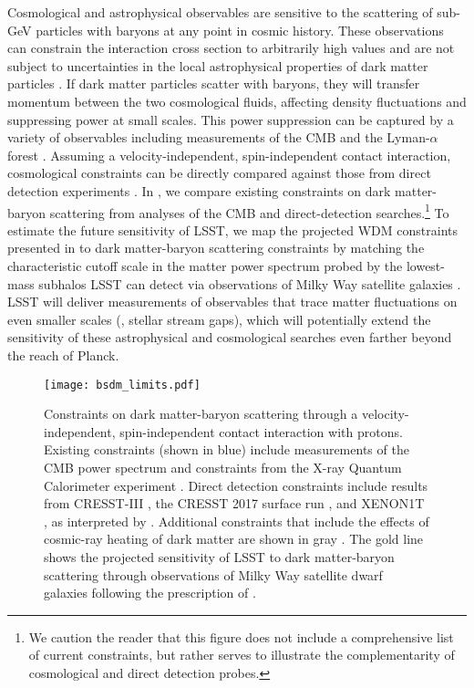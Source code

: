 Cosmological and astrophysical observables are sensitive to the scattering of sub-GeV particles with baryons at any point in cosmic history. 
These observations can constrain the interaction cross section to arbitrarily high values and are not subject to uncertainties in the local astrophysical properties of dark matter particles \citep[\eg,][]{1210.2721,1404.1938}. 
If dark matter particles scatter with baryons, they will transfer momentum between the two cosmological fluids, affecting density fluctuations and suppressing power at small scales. 
This power suppression can be captured by a variety of observables including measurements of the CMB \citep{Dvorkin:2013cea,Gluscevic:2017ywp} and the Lyman-$\alpha$ forest \citep{Xu:2018efh}.
Assuming a velocity-independent, spin-independent contact interaction, cosmological constraints can be directly compared against those from direct detection experiments \citep[\eg,][]{Boddy:2018kfv}.
In , we compare existing constraints on dark matter-baryon scattering from analyses of the CMB and direct-detection searches.\footnote{We caution the reader that this figure does not include a comprehensive list of current constraints, but rather serves to illustrate the complementarity of cosmological and direct detection probes.} 
To estimate the future sensitivity of LSST, we map the projected WDM constraints presented in  to dark matter-baryon scattering constraints by matching the characteristic cutoff scale in the matter power spectrum probed by the lowest-mass subhalos LSST can detect via observations of Milky Way satellite galaxies \citep{Nadler:2019}. 
LSST will deliver measurements of observables that trace matter fluctuations on even smaller scales (\eg, stellar stream gaps), which will potentially extend the sensitivity of these astrophysical and cosmological searches even farther beyond the reach of Planck.

\begin{figure}
\centering
\texttt{[image: bsdm\_limits.pdf]}
\caption{
Constraints on dark matter-baryon scattering through a velocity-independent, spin-independent contact interaction with protons. 
Existing constraints (shown in blue) include measurements of the CMB power spectrum \citep[CMB;][]{Gluscevic:2017ywp} and constraints from the X-ray Quantum Calorimeter experiment \citep[XQC;][]{0704.0794}. Direct detection constraints include results from CRESST-III \citep{1711.07692}, the CRESST 2017 surface run \citep{1707.06749}, and XENON1T \citep{1705.06655}, as interpreted by \citet[][]{1802.04764}. %
Additional constraints that include the effects of cosmic-ray heating of dark matter are shown in gray \citep[][]{1810.10543}.
The gold line shows the projected sensitivity of LSST to dark matter-baryon scattering through observations of Milky Way satellite dwarf galaxies following the prescription of \citet{Nadler:2019}.
}
\label{fig:dd}
\end{figure}

